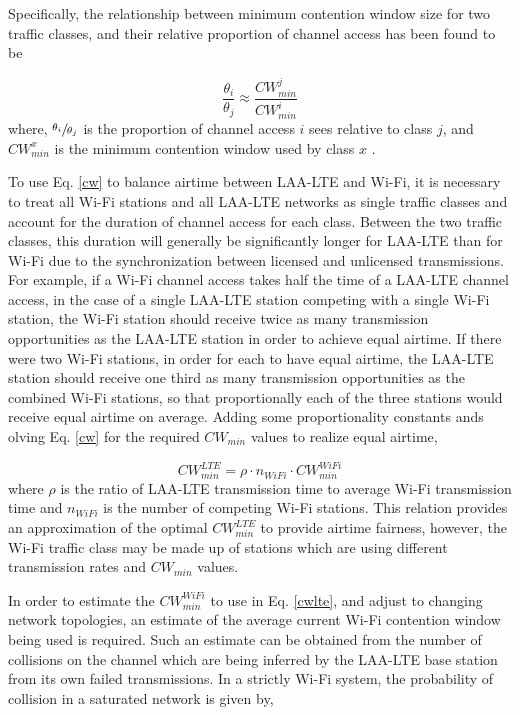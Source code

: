 Specifically, the relationship between minimum contention window size for two traffic classes, and their relative proportion of channel access has been found to be

\begin{equation}\label{cw}
\frac{\theta_i}{\theta_j} \approx \frac{CW^j_{min}}{CW^i_{min}}
\end{equation}
where, $\sfrac{\theta_i}{\theta_j}$ is the proportion of channel access $i$ sees relative to class $j$, and $CW^x_{min}$ is the minimum contention window used by class $x$ \cite{chou}\cite{yoon}.  

To use Eq. \ref{cw} to balance airtime between \mbox{LAA-LTE} and \mbox{Wi-Fi}, it is necessary to treat all \mbox{Wi-Fi} stations and all LAA-LTE networks as single traffic classes and account for the duration of channel access for each class. Between the two traffic classes, this duration will generally be significantly longer for LAA-LTE than for Wi-Fi due to the synchronization between licensed and unlicensed transmissions. For example, if a \mbox{Wi-Fi} channel access takes half the time of a \mbox{LAA-LTE} channel access, in the case of a single \mbox{LAA-LTE} station competing with a single \mbox{Wi-Fi} station, the \mbox{Wi-Fi} station should receive twice as many transmission opportunities as the \mbox{LAA-LTE} station in order to achieve equal airtime.  If there were two \mbox{Wi-Fi} stations, in order for each to have equal airtime, the \mbox{LAA-LTE} station should receive one third as many transmission opportunities as the combined \mbox{Wi-Fi} stations, so that proportionally each of the three stations would receive equal airtime on average.  Adding some proportionality constants ands olving Eq. \ref{cw} for the required $CW_{min}$ values to realize equal airtime,

\begin{equation}\label{cwlte}
CW^{LTE}_{min} = \rho\cdot n_{WiFi} \cdot{CW^{WiFi}_{min}}
\end{equation}
where $\rho$ is the ratio of \mbox{LAA-LTE} transmission time to average \mbox{Wi-Fi} transmission time and $n_{WiFi}$ is the number of competing \mbox{Wi-Fi} stations.  This relation provides an approximation of the optimal $CW^{LTE}_{min}$ to provide airtime fairness, however, the \mbox{Wi-Fi} traffic class may be made up of stations which are using different transmission rates and $CW_{min}$ values.  

In order to estimate the $CW^{WiFi}_{min}$ to use in Eq. \ref{cwlte}, and adjust to changing network topologies, an estimate of the average current Wi-Fi contention window being used is required.  Such an estimate can be obtained from the number of collisions on the channel which are being inferred by the LAA-LTE base station from its own failed transmissions.  In a strictly \mbox{Wi-Fi} system, the probability of collision in a saturated network is given by, 

